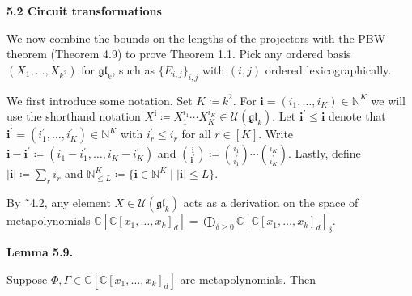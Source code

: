 \par\medskip\noindent\textbf{5.2 Circuit transformations}\par




We now combine the bounds on the lengths of the projectors with the PBW theorem (Theorem 4.9) to prove Theorem 1.1.
Pick any ordered basis $(X_{1},\ldots,X_{k^{2}})$ for $\mathfrak{gl}_{k}$, such as $\{E_{i,j}\}_{i,j}$ with $(i,j)$ ordered lexicographically.





We first introduce some notation.
Set $K\coloneqq k^{2}$.
For $\bm{i}=(i_{1},\ldots,i_{K})\in\mathbb{N}^{K}$ we will use the shorthand notation $X^{\bm{i}}\coloneqq X_{1}^{i_{1}}\cdots X_{K}^{i_{K}}\in\mathcal{U}(\mathfrak{gl}_{k})$.
Let $\bm{i}^{\prime}\leq\bm{i}$ denote that $\bm{i}^{\prime}=(i^{\prime}_{1},\ldots,i^{\prime}_{K})\in\mathbb{N}^{K}$ with $i^{\prime}_{r}\leq i_{r}$ for all $r\in[K]$.
Write $\bm{i}-\bm{i}^{\prime}\coloneqq(i_{1}-i^{\prime}_{1},\ldots,i_{K}-i^{\prime}_{K})$ and $\binom{\bm{i}}{\bm{i}^{\prime}}\coloneqq\binom{i_{1}}{i^{\prime}_{1}}\cdots\binom{i_{K}}{i^{\prime}_{K}}$. Lastly, define $|\bm{i}|\coloneqq\sum_{r}i_{r}$
and $\mathbb{N}^{K}_{\leq L}\coloneqq\{\bm{i}\in\mathbb{N}^{K}\mid|\bm{i}|\leq L\}$.





By ˜4.2, any element $X\in\mathcal{U}(\mathfrak{gl}_{k})$ acts as a derivation on the space of metapolynomials $\mathbb{C}[\mathbb{C}[x_{1},\ldots,x_{k}]_{d}]=\bigoplus_{\delta\geq 0}\mathbb{C}[\mathbb{C}[x_{1},\ldots,x_{k}]_{d}]_{\delta}$.





\par\medskip\noindent\textbf{Lemma 5.9.}\par



Suppose $\Phi,\Gamma\in\mathbb{C}[\mathbb{C}[x_{1},\ldots,x_{k}]_{d}]$ are metapolynomials. Then



